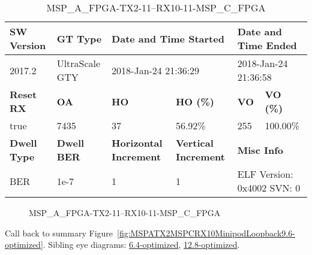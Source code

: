 \begin{table}[h]
\centering
\caption{MSP\_A\_FPGA-TX2-11--RX10-11-MSP\_C\_FPGA}
\label{tab:MSPAFPGATX211RX1011MSPCFPGA9.6-optimized}
\begin{tabular}{@{}|l|l|l|l|l|l|@{}}
\toprule
\textbf{SW Version}                & \textbf{GT Type}   & \multicolumn{2}{l|}{\textbf{Date and Time Started}}            & \multicolumn{2}{l|}{\textbf{Date and Time Ended}}        \\ \midrule
2017.2                       & UltraScale GTY          & \multicolumn{2}{l|}{2018-Jan-24 21:36:29}                   & \multicolumn{2}{l|}{2018-Jan-24 21:36:58}               \\ \midrule
\textbf{Reset RX}                  & \textbf{OA} & \textbf{HO}   & \textbf{HO (\%)} & \textbf{VO} & \textbf{VO (\%)} \\ \midrule
true & 7435        & 37          & 56.92\%        & 255        & 100.00\%       \\ \midrule
\textbf{Dwell Type}                & \textbf{Dwell BER} & \textbf{Horizontal Increment} & \textbf{Vertical Increment}    & \multicolumn{2}{l|}{\textbf{Misc Info}}                  \\ \midrule
BER                            & 1e-7        & 1        & 1           & \multicolumn{2}{l|}{ELF Version: 0x4002 SVN: 0}                         \\ \bottomrule
\end{tabular}
\end{table}

\begin{figure}[h]
\caption{MSP\_A\_FPGA-TX2-11--RX10-11-MSP\_C\_FPGA} \label{fig:MSPAFPGATX211RX1011MSPCFPGA9.6-optimized}
\end{figure}

Call back to summary Figure~\ref{fig:MSPATX2MSPCRX10MinipodLoopback9.6-optimized}.
Sibling eye diagrams: \hyperref[sec:MSPAFPGATX211RX1011MSPCFPGA6.4-optimized]{6.4-optimized}, \hyperref[sec:MSPAFPGATX211RX1011MSPCFPGA12.8-optimized]{12.8-optimized}.

\clearpage
\newpage

